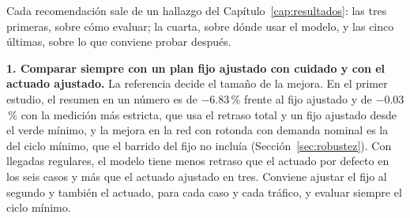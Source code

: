
Cada recomendación sale de un hallazgo del
Capítulo~\ref{cap:resultados}: las tres primeras, sobre cómo evaluar; la
cuarta, sobre dónde usar el modelo, y las cinco últimas, sobre lo que
conviene probar después.

\noindent\textbf{1. Comparar siempre con un plan fijo ajustado con
cuidado y con el actuado ajustado.} La referencia decide el tamaño de la
mejora. En el primer estudio, el resumen en un número es de $-6.83$\,\%
frente al fijo ajustado y de $-0.03$\,\% con la medición más estricta,
que usa el retraso total y un fijo ajustado desde el verde mínimo, y la
mejora en la red con rotonda con demanda nominal es la del ciclo mínimo,
que el barrido del fijo no incluía (Sección~\ref{sec:robustez}). Con
llegadas regulares, el modelo tiene menos retraso que el actuado por
defecto en los seis casos y más que el actuado ajustado en tres.
Conviene ajustar el fijo al segundo y también el actuado, para cada caso
y cada tráfico, y evaluar siempre el ciclo mínimo.

